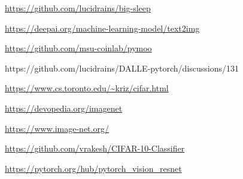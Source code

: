 \documentclass[12pt,a4paper,openany]{book}
\begin{document}
\begin{thebibliography}{a,b,c}
 \url{https://github.com/lucidrains/big-sleep}

 \url{https://deepai.org/machine-learning-model/text2img}

 \url{https://github.com/msu-coinlab/pymoo}

 https://github.com/lucidrains/DALLE-pytorch/discussions/131

 \url{https://www.cs.toronto.edu/~kriz/cifar.html}

 \url{https://devopedia.org/imagenet}

 \url{https://www.image-net.org/}

 \url{https://github.com/vrakesh/CIFAR-10-Classifier}

 \url{https://pytorch.org/hub/pytorch_vision_resnet}

\end{thebibliography}
\end{document}
